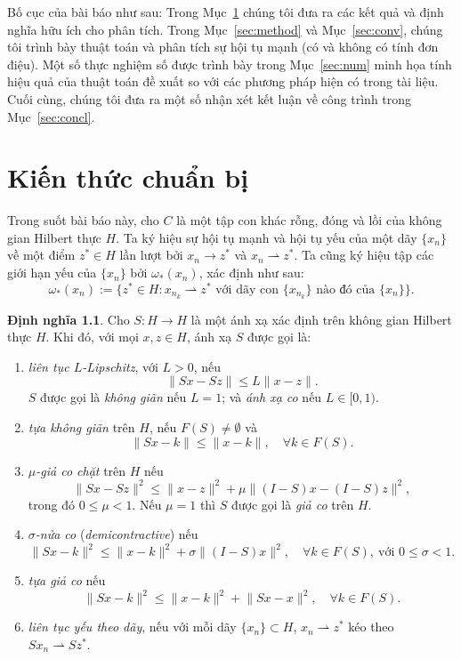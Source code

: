\documentclass{MyBook}
\theoremstyle{plain}
\theoremstyle{definition}
\newtheorem{definition}[theorem]{Định nghĩa}
\theoremstyle{remark}
\numberwithin{equation}{chapter}
\newcommand{\nm}[1]{\lVert #1\rVert}
\newcommand{\wto}{\rightharpoonup}
\newcommand{\Fix}[1]{F(#1)}
\begin{document}
Bố cục của bài báo như sau: Trong Mục~\ref{sec:pre} chúng tôi đưa ra các kết quả và định nghĩa hữu ích cho phân tích. Trong Mục~\ref{sec:method} và Mục~\ref{sec:conv}, chúng tôi trình bày thuật toán và phân tích sự hội tụ mạnh (có và không có tính đơn điệu). Một số thực nghiệm số được trình bày trong Mục~\ref{sec:num} minh họa tính hiệu quả của thuật toán đề xuất so với các phương pháp hiện có trong tài liệu. Cuối cùng, chúng tôi đưa ra một số nhận xét kết luận về công trình trong Mục~\ref{sec:concl}.

\chapter{Kiến thức chuẩn bị}\label{sec:pre}

Trong suốt bài báo này, cho $C$ là một tập con khác rỗng, đóng và lồi của không gian Hilbert thực $H$. Ta ký hiệu sự hội tụ mạnh và hội tụ yếu của một dãy $\{x_n\}$ về một điểm $z^{*}\in H$ lần lượt bởi $x_n\to z^{*}$ và $x_n\wto z^{*}$. Ta cũng ký hiệu tập các giới hạn yếu của $\{x_n\}$ bởi $\omega_{*}(x_n)$, xác định như sau:
\[
\omega_{*}(x_n) := \{z^{*}\in H : x_{n_k}\wto z^{*} \text{ với dãy con } \{x_{n_k}\} \text{ nào đó của } \{x_n\}\}.
\]

\begin{definition}
Cho $S:H\to H$ là một ánh xạ xác định trên không gian Hilbert thực $H$. Khi đó, với mọi $x,z\in H$, ánh xạ $S$ được gọi là:
\begin{enumerate}[label=(\roman*)]
\item \textit{liên tục $L$-Lipschitz}, với $L>0$, nếu
\[
\nm{Sx-Sz}\le L\nm{x-z}.
\]
$S$ được gọi là \textit{không giãn} nếu $L=1$; và \textit{ánh xạ co} nếu $L\in[0,1)$.
\item \textit{tựa không giãn} trên $H$, nếu $\Fix{S}\ne\emptyset$ và
\[
\nm{Sx-k}\le\nm{x-k},\quad\forall k\in \Fix{S}.
\]
\item \textit{$\mu$-giả co chặt} trên $H$ nếu
\[
\nm{Sx-Sz}^2\le\nm{x-z}^2+\mu\nm{(I-S)x-(I-S)z}^2,
\]
trong đó $0\le\mu<1$. Nếu $\mu=1$ thì $S$ được gọi là \textit{giả co} trên $H$.
\item \textit{$\sigma$-nửa co} (\textit{demicontractive}) nếu
\[
\nm{Sx-k}^2\le\nm{x-k}^2+\sigma\nm{(I-S)x}^2,\quad\forall k\in \Fix{S},\ \text{với } 0\le\sigma<1.
\]
\item \textit{tựa giả co} nếu
\[
\nm{Sx-k}^2\le\nm{x-k}^2+\nm{Sx-x}^2,\quad\forall k\in \Fix{S}.
\]
\item[(vii)] \textit{liên tục yếu theo dãy}, nếu với mỗi dãy $\{x_n\}\subset H$, $x_n\wto z^{*}$ kéo theo $Sx_n\wto Sz^{*}$.
\end{enumerate}
\end{definition}
\end{document}
